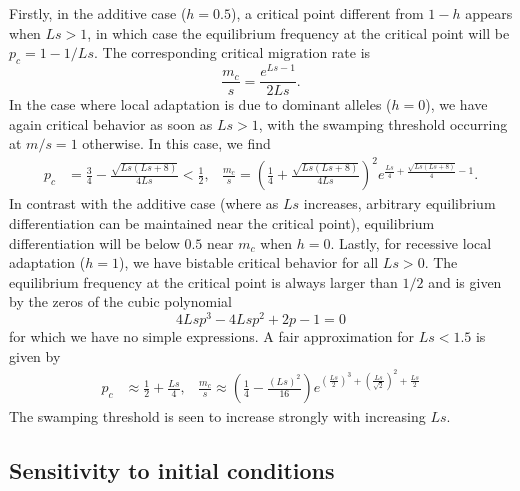 \documentclass[
  11pt,
]{article}
\begin{document}
Firstly, in the additive case (\(h=0.5\)), a critical point different
from \(1-h\) appears when \(Ls > 1\), in which case the equilibrium
frequency at the critical point will be \(p_c = 1-1/Ls\). The
corresponding critical migration rate is
\[\frac{m_c}{s} = \frac{e^{Ls-1}}{2Ls}.\] In the case where local
adaptation is due to dominant alleles (\(h=0\)), we have again critical
behavior as soon as \(Ls>1\), with the swamping threshold occurring at
\(m/s=1\) otherwise. In this case, we find \begin{align*}
    p_c &= \frac{3}{4} - \frac{\sqrt{L s(Ls + 8)}}{4 L s} < \frac{1}{2}, 
  & \frac{m_c}{s} = 
    \left(\frac{1}{4} + \frac{\sqrt{L s \left(L s + 8\right)}}{4Ls}\right)^{2} e^{\frac{L s}{4}
    + \frac{\sqrt{L s \left(L s + 8\right)}}{4} - 1}.
\end{align*} In contrast with the additive case (where as \(Ls\)
increases, arbitrary equilibrium differentiation can be maintained near
the critical point), equilibrium differentiation will be below \(0.5\)
near \(m_c\) when \(h=0\). Lastly, for recessive local adaptation
(\(h=1\)), we have bistable critical behavior for all \(Ls > 0\). The
equilibrium frequency at the critical point is always larger than
\(1/2\) and is given by the zeros of the cubic polynomial
\[4 Ls p^{3} - 4 Ls p^{2} + 2 p - 1 = 0\] for which we have no simple
expressions. A fair approximation for \(Ls < 1.5\) is given by
\begin{align*}
  p_c &\approx \frac{1}{2} + \frac{Ls}{4}, 
  & \frac{m_c}{s} \approx \left(\frac{1}{4} - \frac{(L s)^2}{16}  \right) 
  e^{\left(\frac{Ls}{2}\right)^{3} +  \left(\frac{L s}{\sqrt 2}\right)^2 +
    \frac{Ls}{2}}
\end{align*} The swamping threshold is seen to increase strongly with
increasing \(Ls\).

\hypertarget{sec:init}{%
\subsection{Sensitivity to initial conditions}\label{sec:init}}
\end{document}
